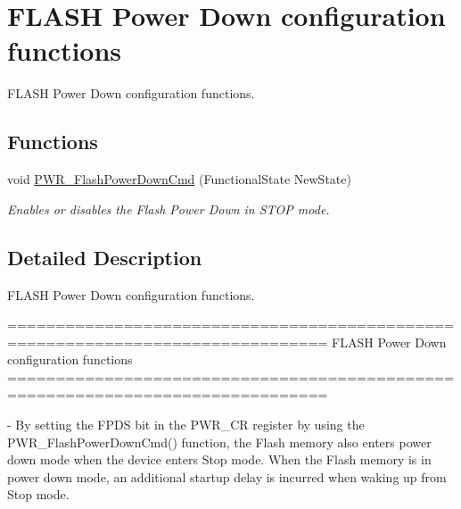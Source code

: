 \hypertarget{group___p_w_r___group5}{\section{F\-L\-A\-S\-H Power Down configuration functions}
\label{group___p_w_r___group5}
}


F\-L\-A\-S\-H Power Down configuration functions.  


\subsection*{Functions}
\begin{DoxyCompactItemize}
\item 
void \hyperlink{group___p_w_r___group5_gaf0af19a9fdf0324f2ada60c9bce1aab5}{P\-W\-R\-\_\-\-Flash\-Power\-Down\-Cmd} (Functional\-State New\-State)
\begin{DoxyCompactList}\small\item\em Enables or disables the Flash Power Down in S\-T\-O\-P mode. \end{DoxyCompactList}\end{DoxyCompactItemize}


\subsection{Detailed Description}
F\-L\-A\-S\-H Power Down configuration functions. \begin{DoxyVerb} ===============================================================================
           FLASH Power Down configuration functions
 ===============================================================================  

 - By setting the FPDS bit in the PWR_CR register by using the PWR_FlashPowerDownCmd()
   function, the Flash memory also enters power down mode when the device enters 
   Stop mode. When the Flash memory is in power down mode, an additional startup 
   delay is incurred when waking up from Stop mode.\end{DoxyVerb}
 

